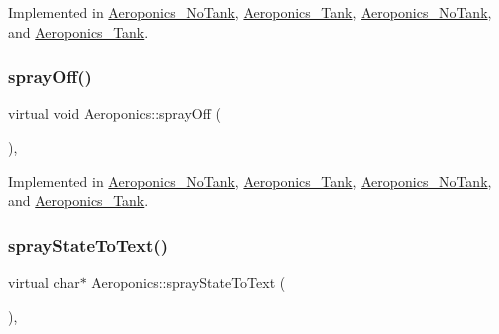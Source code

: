 Implemented in \hyperlink{class_aeroponics___no_tank_a37537625cd3d80d6c49adeae298d4a76}{Aeroponics\+\_\+\+No\+Tank}, \hyperlink{class_aeroponics___tank_aa97abbd76332098f8662b78c451deee5}{Aeroponics\+\_\+\+Tank}, \hyperlink{class_aeroponics___no_tank_a37537625cd3d80d6c49adeae298d4a76}{Aeroponics\+\_\+\+No\+Tank}, and \hyperlink{class_aeroponics___tank_aa97abbd76332098f8662b78c451deee5}{Aeroponics\+\_\+\+Tank}.

\mbox{\label{class_aeroponics_a961b5818322eb6d0268d2f2f4763768e}} 
\subsubsection{\texorpdfstring{spray\+Off()}{sprayOff()}\hspace{0.1cm}{\footnotesize\ttfamily [2/2]}}
{\footnotesize\ttfamily virtual void Aeroponics\+::spray\+Off (\begin{DoxyParamCaption}{ }\end{DoxyParamCaption})\hspace{0.3cm}{\ttfamily [protected]}, {}}



Implemented in \hyperlink{class_aeroponics___no_tank_a37537625cd3d80d6c49adeae298d4a76}{Aeroponics\+\_\+\+No\+Tank}, \hyperlink{class_aeroponics___tank_aa97abbd76332098f8662b78c451deee5}{Aeroponics\+\_\+\+Tank}, \hyperlink{class_aeroponics___no_tank_a37537625cd3d80d6c49adeae298d4a76}{Aeroponics\+\_\+\+No\+Tank}, and \hyperlink{class_aeroponics___tank_aa97abbd76332098f8662b78c451deee5}{Aeroponics\+\_\+\+Tank}.

\mbox{\label{class_aeroponics_aa79435aaa49a563d41ae092ec3e87e06}} 
\subsubsection{\texorpdfstring{spray\+State\+To\+Text()}{sprayStateToText()}\hspace{0.1cm}{\footnotesize\ttfamily [1/2]}}
{\footnotesize\ttfamily virtual char$\ast$ Aeroponics\+::spray\+State\+To\+Text (\begin{DoxyParamCaption}{ }\end{DoxyParamCaption})\hspace{0.3cm}{\ttfamily [protected]}, {}}



